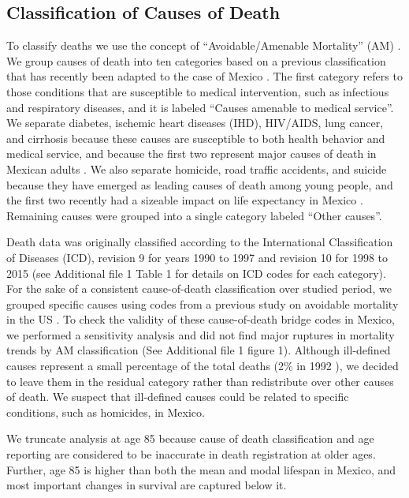 \documentclass{bmcart}
\begin{document}
\subsection*{Classification of Causes of Death}
To classify deaths we use the concept of ``Avoidable/Amenable Mortality'' (AM) \cite{nolte&mckee2004, nolte&mckee2008}. We group causes of death into ten categories based on a previous classification  \cite{elo2014} that has recently been adapted to the case of Mexico \cite{Aburto2015}. The first category refers to those conditions that are susceptible to medical intervention, such as infectious and respiratory diseases, and it is labeled ``Causes amenable to medical service''. We separate diabetes, ischemic heart diseases (IHD), HIV/AIDS, lung
cancer, and cirrhosis because these causes are susceptible to both health behavior
and medical service, and because the first two represent major causes of death
in Mexican adults \cite{gomez2016dissonant}. We also separate
homicide, road traffic accidents, and suicide because they have emerged as
leading causes of death among young people, and the first two recently had a sizeable
impact on life expectancy in Mexico \cite{Aburto2015}. Remaining causes were grouped into a single category labeled ``Other causes''. 

Death data was originally classified according to the International Classification of Diseases (ICD), revision 9 for years 1990 to 1997 and revision 10 for 1998 to 2015 (see Additional file 1 Table 1 for details on ICD codes for each category). For the sake of a consistent cause-of-death classification over studied period, we grouped specific causes using codes from a previous study on avoidable mortality in the US \cite{elo2014}. To check the validity of these cause-of-death bridge codes in Mexico, we performed a sensitivity analysis and did not find major ruptures in mortality trends by AM classification (See Additional file 1 figure 1). Although ill-defined causes represent a small percentage of the total deaths (2\% in 1992 \cite{rivera2002epidemiological}), we decided to leave them in the residual category rather than redistribute over other causes of death. We suspect that ill-defined causes could be related to specific conditions, such as homicides, in Mexico.

We truncate analysis at age 85 because cause of death classification and age reporting are considered to be inaccurate in death registration at older ages. Further, age 85 is higher than both the mean and modal lifespan in Mexico, and most important changes in survival are captured below it. 
\end{document}
